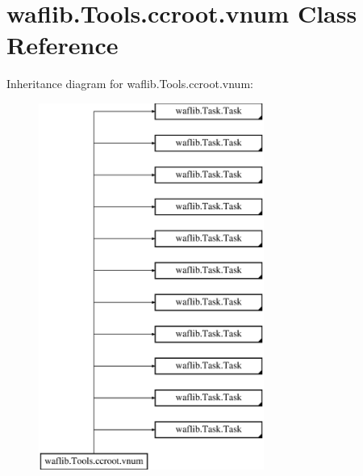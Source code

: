 \hypertarget{classwaflib_1_1_tools_1_1ccroot_1_1vnum}{}\section{waflib.\+Tools.\+ccroot.\+vnum Class Reference}
\label{classwaflib_1_1_tools_1_1ccroot_1_1vnum}
Inheritance diagram for waflib.\+Tools.\+ccroot.\+vnum\+:\begin{figure}[H]
\begin{center}
\leavevmode
\includegraphics[height=12.000000cm]{classwaflib_1_1_tools_1_1ccroot_1_1vnum}
\end{center}
\end{figure}
